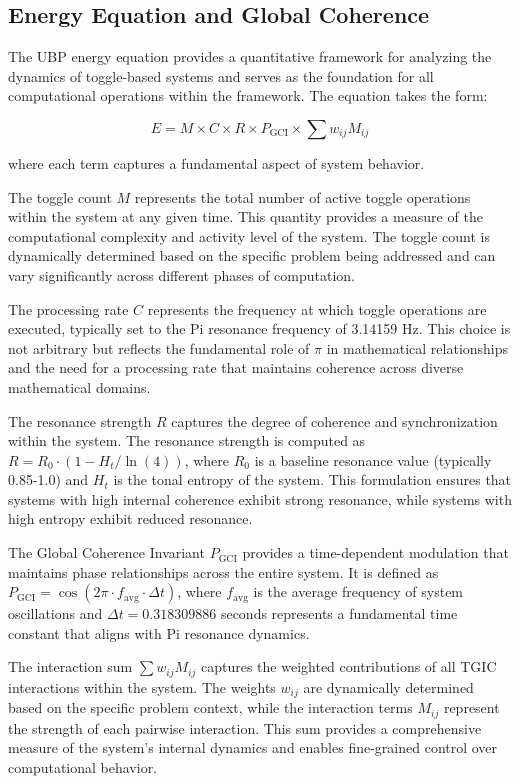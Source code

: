 \documentclass[11pt]{amsart}
\begin{document}
\subsection{Energy Equation and Global Coherence}

The UBP energy equation provides a quantitative framework for analyzing the dynamics of toggle-based systems and serves as the foundation for all computational operations within the framework. The equation takes the form:

$$E = M \times C \times R \times P_{\text{GCI}} \times \sum w_{ij} M_{ij}$$

where each term captures a fundamental aspect of system behavior.

The toggle count $M$ represents the total number of active toggle operations within the system at any given time. This quantity provides a measure of the computational complexity and activity level of the system. The toggle count is dynamically determined based on the specific problem being addressed and can vary significantly across different phases of computation.

The processing rate $C$ represents the frequency at which toggle operations are executed, typically set to the Pi resonance frequency of 3.14159 Hz. This choice is not arbitrary but reflects the fundamental role of $\pi$ in mathematical relationships and the need for a processing rate that maintains coherence across diverse mathematical domains.

The resonance strength $R$ captures the degree of coherence and synchronization within the system. The resonance strength is computed as $R = R_0 \cdot (1 - H_t / \ln(4))$, where $R_0$ is a baseline resonance value (typically 0.85-1.0) and $H_t$ is the tonal entropy of the system. This formulation ensures that systems with high internal coherence exhibit strong resonance, while systems with high entropy exhibit reduced resonance.

The Global Coherence Invariant $P_{\text{GCI}}$ provides a time-dependent modulation that maintains phase relationships across the entire system. It is defined as $P_{\text{GCI}} = \cos(2\pi \cdot f_{\text{avg}} \cdot \Delta t)$, where $f_{\text{avg}}$ is the average frequency of system oscillations and $\Delta t = 0.318309886$ seconds represents a fundamental time constant that aligns with Pi resonance dynamics.

The interaction sum $\sum w_{ij} M_{ij}$ captures the weighted contributions of all TGIC interactions within the system. The weights $w_{ij}$ are dynamically determined based on the specific problem context, while the interaction terms $M_{ij}$ represent the strength of each pairwise interaction. This sum provides a comprehensive measure of the system's internal dynamics and enables fine-grained control over computational behavior.
\end{document}
